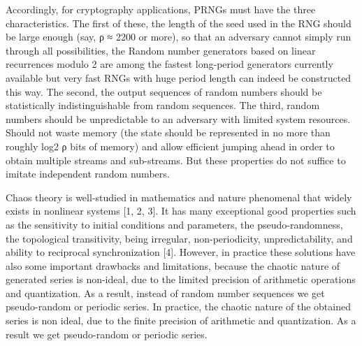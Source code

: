 \label{Introduction}
Accordingly, for cryptography applications, PRNGs must have the three characteristics. The first of these, the length of the seed used in the RNG should be large enough (say, ρ ≈ 2200 or more), so that an adversary cannot simply run through all possibilities, the Random number generators based on linear recurrences modulo 2 are among the fastest long-period generators currently available but very fast RNGs with huge period length can indeed be constructed this way. The second, the output sequences of random numbers should be statistically indistinguishable from random sequences. The third, random numbers should be unpredictable to an adversary with limited system resources. Should not waste memory (the state should be represented in no more than roughly log2 ρ bits of memory) and allow efficient jumping ahead in order to obtain multiple streams and sub-streams. But these properties do not suffice to imitate independent random numbers.

\noindent Chaos theory is well-studied in mathematics and nature phenomenal that widely exists in nonlinear systems [1, 2, 3]. It has many exceptional good properties such as the sensitivity to initial conditions and parameters, the pseudo-randomness, the topological transitivity, being irregular, non-periodicity, unpredictability, and ability to reciprocal synchronization [4]. However, in practice these solutions have also some important drawbacks and limitations, because the chaotic nature of generated series is non-ideal, due to the limited precision of arithmetic operations and quantization. As a result, instead of random number sequences we get pseudo-random or periodic series. In practice, the chaotic nature of the obtained series is non ideal, due to the finite precision of arithmetic and quantization. As a result we get pseudo-random or periodic series.